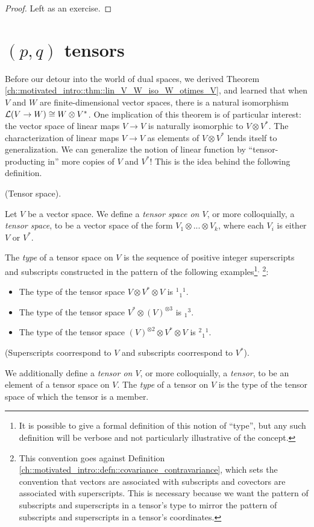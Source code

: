 \begin{proof}
     Left as an exercise.
\end{proof}

\newpage

\section{$(p, q)$ tensors}

Before our detour into the world of dual spaces, we derived Theorem \ref{ch::motivated_intro::thm::lin_V_W_iso_W_otimes_V}, and learned that when $V$ and $W$ are finite-dimensional vector spaces, there is a natural isomorphism $\mathcal{L}(V \rightarrow W) \cong W \otimes V^*$. One implication of this theorem is of particular interest: the vector space of linear maps $V \rightarrow V$ is naturally isomorphic to $V \otimes V^*$. The characterization of linear maps $V \rightarrow V$ as elements of $V \otimes V^*$ lends itself to generalization. We can generalize the notion of linear function by ``tensor-producting in'' more copies of $V$ and $V^*$! This is the idea behind the following definition.

\begin{defn}
    (Tensor space).
    
    Let $V$ be a vector space. We define a \textit{tensor space on $V$}, or more colloquially, a \textit{tensor space}, to be a vector space of the form $V_1 \otimes ... \otimes V_k$, where each $V_i$ is either $V$ or $V^*$.
    
    The \textit{type} of a tensor space on $V$ is the sequence of positive integer superscripts and subscripts constructed in the pattern of the following examples\footnote{It is possible to give a formal definition of this notion of ``type'', but any such definition will be verbose and not particularly illustrative of the concept.}$^{,}$ \footnote{This convention goes against Definition \ref{ch::motivated_intro::defn::covariance_contravariance}, which sets the convention that vectors are associated with subscripts and covectors are associated with superscripts. This is necessary because we want the pattern of subscripts and superscripts in a tensor's type to mirror the pattern of subscripts and superscripts in a tensor's coordinates.}:
    
    \begin{itemize}
        \item The type of the tensor space $V \otimes V^* \otimes V$ is $^1{}_1{}^1$.
        \item The type of the tensor space $V^* \otimes (V)^{\otimes 3}$ is $_1{}^3$.
        \item The type of the tensor space $(V)^{\otimes 2} \otimes V^* \otimes V$ is $^2{}_1{}^1$.
    \end{itemize}

    (Superscripts coorrespond to $V$ and subscripts coorrespond to $V^*$).
    
    We additionally define a \textit{tensor on $V$}, or more colloquially, a \textit{tensor}, to be an element of a tensor space on $V$. The \textit{type} of a tensor on $V$ is the type of the tensor space of which the tensor is a member.
\end{defn}

